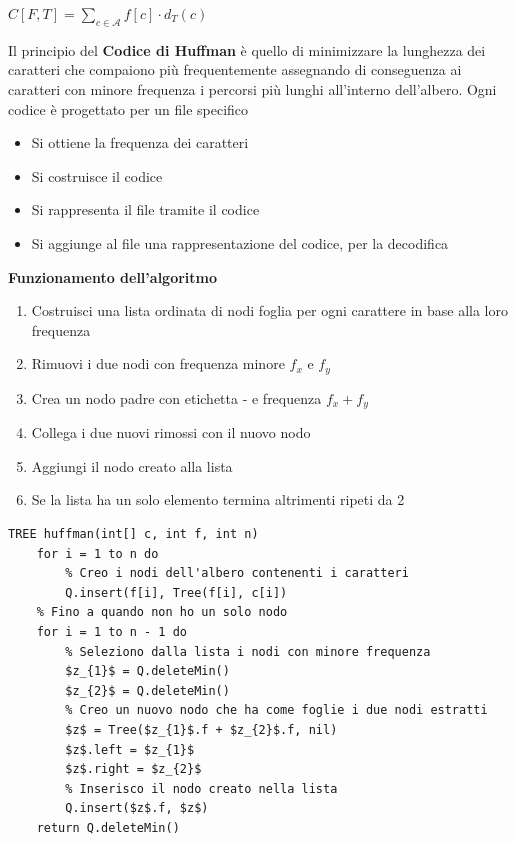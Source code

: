 \documentclass[../cheatSheetAlgoritmi.tex]{subfiles}
\begin{document}
\begin{center}
	$C[F, T] = \sum_{c \in \mathcal{A}} f[c] \cdot d_{T}(c)$
\end{center}
Il principio del \textbf{Codice di Huffman} è quello di minimizzare la lunghezza dei caratteri che compaiono più frequentemente assegnando di conseguenza ai caratteri con minore frequenza i percorsi più lunghi all'interno dell'albero. Ogni codice è progettato per un file specifico
\begin{itemize}
	\item Si ottiene la frequenza dei caratteri
	\item Si costruisce il codice
	\item Si rappresenta il file tramite il codice
	\item Si aggiunge al file una rappresentazione del codice, per la decodifica
\end{itemize}
\textbf{Funzionamento dell'algoritmo}
\begin{enumerate}
	\item Costruisci una lista ordinata di nodi foglia per ogni carattere in base alla loro frequenza
	\item Rimuovi i due nodi con frequenza minore $f_{x}$ e $f_{y}$
	\item Crea un nodo padre con etichetta - e frequenza $f_{x} + f_{y}$
	\item Collega i due nuovi rimossi con il nuovo nodo
	\item Aggiungi il nodo creato alla lista 
	\item Se la lista ha un solo elemento termina altrimenti ripeti da 2
\end{enumerate}
\begin{lstlisting}[caption=creazione albero binario di decodifica]
TREE huffman(int[] c, int f, int n)
	for i = 1 to n do
		% Creo i nodi dell'albero contenenti i caratteri
		Q.insert(f[i], Tree(f[i], c[i])
	% Fino a quando non ho un solo nodo
	for i = 1 to n - 1 do
		% Seleziono dalla lista i nodi con minore frequenza
		$z_{1}$ = Q.deleteMin()
		$z_{2}$ = Q.deleteMin()
		% Creo un nuovo nodo che ha come foglie i due nodi estratti
		$z$ = Tree($z_{1}$.f + $z_{2}$.f, nil)
		$z$.left = $z_{1}$
		$z$.right = $z_{2}$
		% Inserisco il nodo creato nella lista
		Q.insert($z$.f, $z$)
	return Q.deleteMin()
\end{lstlisting}
\end{document}
